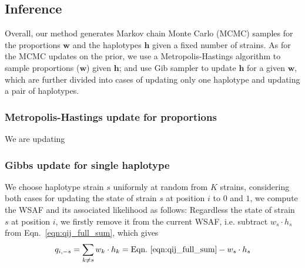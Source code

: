 \documentclass{bioinfo}
\begin{document}



\subsection{Inference}

Overall, our method generates Markov chain Monte Carlo (MCMC) samples for the proportions $\mathbf w$ and the haplotypes $\mathbf h$ given a fixed number of strains. As for the MCMC updates on the prior, we use a Metropolis-Hastings algorithm to sample proportions ($\mathbf w$) given $\mathbf h$; and use Gib sampler to update $\mathbf h$ for a given $\mathbf w$, which are further divided into cases of updating only one haplotype and updating a pair of haplotypes.


\subsubsection{Metropolis-Hastings update for proportions}\label{sec:updateP}

We are updating

\subsubsection{Gibbs update for single haplotype}

We choose haplotype strain $s$ uniformly at random from $K$ strains, considering both cases for updating the state of strain $s$ at position $i$ to $0$ and $1$, we compute the WSAF and its associated likelihood as follows: Regardless the state of strain $s$ at position $i$, we firstly remove it from the current WSAF, i.e. subtract $ w_s \cdot h_s$ from Eqn.~\eqref{eqn:qij_full_sum}, which gives
\begin{equation}
q_{i,-s} = \sum_{k\neq s} w_k \cdot h_k = \textrm{Eqn.~\eqref{eqn:qij_full_sum}} -  w_s \cdot h_s \label{eqn:qij_full_sum_minus_s}
\end{equation}
\end{document}

